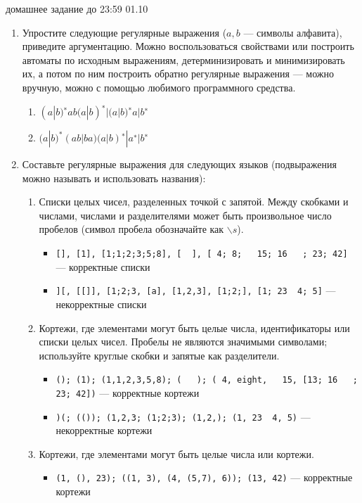 \documentclass[12pt]{article}
\begin{document}

{\Large домашнее задание до 23:59 01.10}
\bigskip

\begin{enumerate}
  \item 
  { Упростите следующие регулярные выражения ($a, b$ --- символы алфавита), приведите аргументацию. Можно воспользоваться свойствами или построить автоматы по исходным выражениям, детерминизировать и минимизировать их, а потом по ним построить обратно регулярные выражения --- можно вручную, можно с помощью любимого программного средства.  
    \begin{enumerate} 
      \item { $ (a | b)^{∗} ab (a | b)^{∗} | (a | b)^{∗} a | b^{∗} $ }
      \item { $ (a | b)^{*} (ab | ba) (a | b)^{∗} | a^{∗} | b^{∗} $ }
    \end{enumerate}
  }
  
  \item
  { Составьте регулярные выражения для следующих языков (подвыражения можно называть и использовать названия): 
    \begin{enumerate}
      \item
      { Списки целых чисел, разделенных точкой с запятой. Между скобками и числами, числами и разделителями может быть произвольное число пробелов (символ пробела обозначайте как $\backslash s$). 
        \begin{itemize} 
          \item \verb![], [1], [1;1;2;3;5;8], [  ], [ 4; 8;   15; 16   ; 23; 42]! --- корректные списки
          \item \verb!][, [[]], [1;2;3, [a], [1,2,3], [1;2;], [1; 23  4; 5]! --- некорректные списки
        \end{itemize}
      }
      \item
      { Кортежи, где элементами могут быть целые числа, идентификаторы или списки целых чисел. Пробелы не являются значимыми символами; используйте круглые скобки и запятые как разделители. 
        \begin{itemize} 
          \item \verb!(); (1); (1,1,2,3,5,8); (   ); ( 4, eight,   15, [13; 16   ; 23; 42])! --- корректные кортежи
          \item \verb!)(; (()); (1,2,3; (1;2;3); (1,2,); (1, 23  4, 5)! --- некорректные кортежи
        \end{itemize}
      }
      \item
      { Кортежи, где элементами могут быть целые числа или кортежи. 
      \begin{itemize} 
          \item \verb!(1, (), 23); ((1, 3), (4, (5,7), 6)); (13, 42)! --- корректные кортежи
      \end{itemize}
      }
    \end{enumerate}
  }


\end{enumerate}
\end{document}
